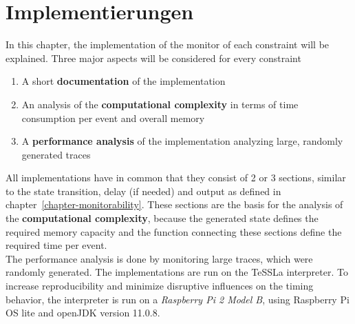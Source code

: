 
\chapter{Implementierungen}
\label{chapter-implementation}

	In this chapter, the implementation of the monitor of each constraint will be explained. Three major aspects will be considered for every constraint
	\begin{enumerate}[1.]
		\item
			A short \textbf{documentation} of the implementation
		\item
			An analysis of the \textbf{computational complexity} in terms of time consumption per event and overall memory
		\item
			A \textbf{performance analysis} of the implementation analyzing large, randomly generated traces
	\end{enumerate}

	 All implementations have in common that they consist of 2 or 3 sections, similar to the state transition, delay (if needed) and output as defined in chapter~\ref{chapter-monitorability}. These sections are the basis for the analysis of the \textbf{computational complexity}, because the generated state defines the required memory capacity and the function connecting these sections define the required time per event.\\
	 The performance analysis is done by monitoring large traces, which were randomly generated. The implementations are run on the TeSSLa interpreter. To increase reproducibility and minimize disruptive influences on the timing behavior, the interpreter is run on a \emph{Raspberry Pi 2 Model B}, using Raspberry Pi OS lite and openJDK version 11.0.8.
	
	 
